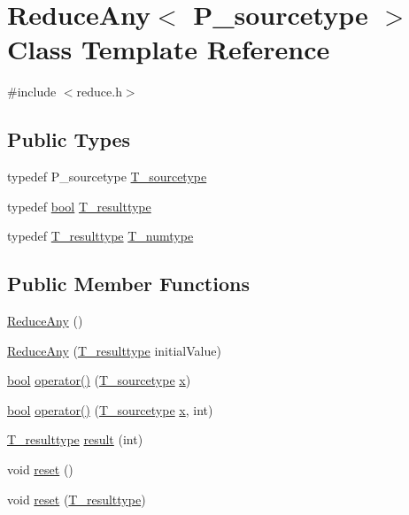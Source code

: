 \hypertarget{classReduceAny}{}\section{Reduce\+Any$<$ P\+\_\+sourcetype $>$ Class Template Reference}
\label{classReduceAny}


{\ttfamily \#include $<$reduce.\+h$>$}

\subsection*{Public Types}
\begin{DoxyCompactItemize}
\item 
typedef P\+\_\+sourcetype \hyperlink{classReduceAny_aca939058a9ec607efe2ed7ebb23ddaf7}{T\+\_\+sourcetype}
\item 
typedef \hyperlink{compiler_8h_abb452686968e48b67397da5f97445f5b}{bool} \hyperlink{classReduceAny_a95a4fe59c854ec752b05800dc935362a}{T\+\_\+resulttype}
\item 
typedef \hyperlink{classReduceAny_a95a4fe59c854ec752b05800dc935362a}{T\+\_\+resulttype} \hyperlink{classReduceAny_af966c7bd201bbd0b89d54534afa215d0}{T\+\_\+numtype}
\end{DoxyCompactItemize}
\subsection*{Public Member Functions}
\begin{DoxyCompactItemize}
\item 
\hyperlink{classReduceAny_a9285ce2b0859664335fbcfae6f485321}{Reduce\+Any} ()
\item 
\hyperlink{classReduceAny_abe7b14a312dcb9c76e2633919dab4d4b}{Reduce\+Any} (\hyperlink{classReduceAny_a95a4fe59c854ec752b05800dc935362a}{T\+\_\+resulttype} initial\+Value)
\item 
\hyperlink{compiler_8h_abb452686968e48b67397da5f97445f5b}{bool} \hyperlink{classReduceAny_a18241aeb40a1d3493a2da7f58e67ade2}{operator()} (\hyperlink{classReduceAny_aca939058a9ec607efe2ed7ebb23ddaf7}{T\+\_\+sourcetype} \hyperlink{vecnorm1_8cc_ac73eed9e41ec09d58f112f06c2d6cb63}{x})
\item 
\hyperlink{compiler_8h_abb452686968e48b67397da5f97445f5b}{bool} \hyperlink{classReduceAny_acd107a78136c4cf90c93d46f5b7dfc1a}{operator()} (\hyperlink{classReduceAny_aca939058a9ec607efe2ed7ebb23ddaf7}{T\+\_\+sourcetype} \hyperlink{vecnorm1_8cc_ac73eed9e41ec09d58f112f06c2d6cb63}{x}, int)
\item 
\hyperlink{classReduceAny_a95a4fe59c854ec752b05800dc935362a}{T\+\_\+resulttype} \hyperlink{classReduceAny_ab2a15aff952d038b6ce9ec7272be1ee9}{result} (int)
\item 
void \hyperlink{classReduceAny_ab1dfe02d10a3fe5cc94519b7976d83dc}{reset} ()
\item 
void \hyperlink{classReduceAny_a4d032a20a9fbeb2bc2f69c4bb79a6a18}{reset} (\hyperlink{classReduceAny_a95a4fe59c854ec752b05800dc935362a}{T\+\_\+resulttype})
\end{DoxyCompactItemize}
